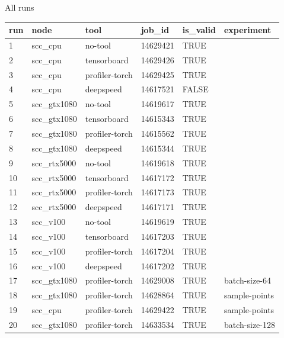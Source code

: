 \documentclass[compress,aspectratio=169]{beamer}
\begin{document}
\begin{frame}{All runs}
\tiny{
\begin{table}[]
\begin{tabular}{@{}llllll@{}}
\toprule
run & node         & tool           & job\_id  & is\_valid & experiment     \\ \midrule
1   & scc\_cpu     & no-tool        & 14629421 & TRUE      &                \\
2   & scc\_cpu     & tensorboard    & 14629426 & TRUE      &                \\
3   & scc\_cpu     & profiler-torch & 14629425 & TRUE      &                \\
4   & scc\_cpu     & deepspeed      & 14617521 & FALSE     &                \\
5   & scc\_gtx1080 & no-tool        & 14619617 & TRUE      &                \\
6   & scc\_gtx1080 & tensorboard    & 14615343 & TRUE      &                \\
7   & scc\_gtx1080 & profiler-torch & 14615562 & TRUE      &                \\
8   & scc\_gtx1080 & deepspeed      & 14615344 & TRUE      &                \\
9   & scc\_rtx5000 & no-tool        & 14619618 & TRUE      &                \\
10  & scc\_rtx5000 & tensorboard    & 14617172 & TRUE      &                \\
11  & scc\_rtx5000 & profiler-torch & 14617173 & TRUE      &                \\
12  & scc\_rtx5000 & deepspeed      & 14617171 & TRUE      &                \\
13  & scc\_v100    & no-tool        & 14619619 & TRUE      &                \\
14  & scc\_v100    & tensorboard    & 14617203 & TRUE      &                \\
15  & scc\_v100    & profiler-torch & 14617204 & TRUE      &                \\
16  & scc\_v100    & deepspeed      & 14617202 & TRUE      &                \\
17  & scc\_gtx1080 & profiler-torch & 14629008 & TRUE      & batch-size-64  \\
18  & scc\_gtx1080 & profiler-torch & 14628864 & TRUE      & sample-points  \\
19  & scc\_cpu     & profiler-torch & 14629422 & TRUE      & sample-points  \\
20  & scc\_gtx1080 & profiler-torch & 14633534 & TRUE      & batch-size-128 \\ \bottomrule
\end{tabular}
\end{table}
}
\end{frame}
\end{document}
